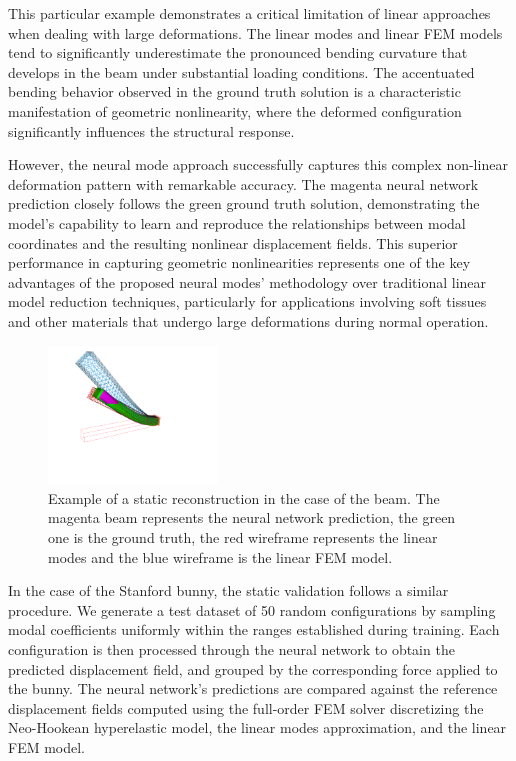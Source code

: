 This particular example demonstrates a critical limitation of linear approaches when dealing with large deformations. The linear modes and linear FEM models tend to significantly underestimate the pronounced bending curvature that develops in the beam under substantial loading conditions. The accentuated bending behavior observed in the ground truth solution is a characteristic manifestation of geometric nonlinearity, where the deformed configuration significantly influences the structural response.

However, the neural mode approach successfully captures this complex non-linear deformation pattern with remarkable accuracy. The magenta neural network prediction closely follows the green ground truth solution, demonstrating the model's capability to learn and reproduce the relationships between modal coordinates and the resulting nonlinear displacement fields. This superior performance in capturing geometric nonlinearities represents one of the key advantages of the proposed neural modes' methodology over traditional linear model reduction techniques, particularly for applications involving soft tissues and other materials that undergo large deformations during normal operation.

\begin{figure}[H]
    \centering
    \includegraphics[width=0.4\textwidth]{Images/sofa_example_beam.png}
    \caption{Example of a static reconstruction in the case of the beam. The magenta beam represents the neural network prediction, the green one is the ground truth, the red wireframe represents the linear modes and the blue wireframe is the linear FEM model.}
    \label{fig:static_rmse_distribution}
\end{figure}

In the case of the Stanford bunny, the static validation follows a similar procedure. We generate a test dataset of 50 random configurations by sampling modal coefficients uniformly within the ranges established during training. Each configuration is then processed through the neural network to obtain the predicted displacement field, and grouped by the corresponding force applied to the bunny. The neural network's predictions are compared against the reference displacement fields computed using the full-order FEM solver discretizing the Neo-Hookean hyperelastic model, the linear modes approximation, and the linear FEM model.

